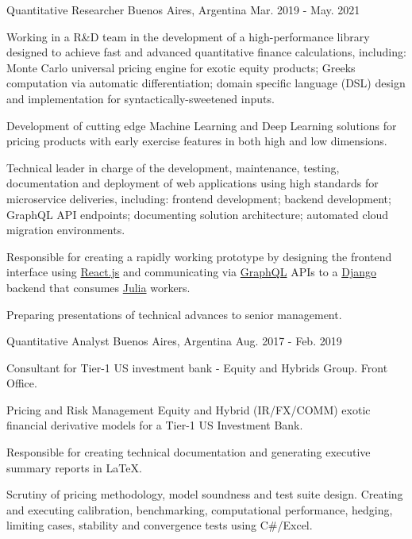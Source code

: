 \begin{cventries}
  \cventry
    {Quantitative Researcher} %
    {} %
    {Buenos Aires, Argentina} %
    {Mar. 2019 - May. 2021} %
    {
      \begin{cvitems} %
          \item{Working in a R\&D team in the development of a high-performance library designed to achieve fast and advanced quantitative finance calculations, including: Monte Carlo universal pricing engine for exotic equity products; Greeks computation via automatic differentiation; domain specific language (DSL) design and implementation for syntactically-sweetened inputs.}
          \item{Development of cutting edge Machine Learning and Deep Learning solutions for pricing products with early exercise features in both high and low dimensions.}
          \item {Technical leader in charge of the development, maintenance, testing, documentation and deployment of web applications using high standards for microservice deliveries, including: frontend development; backend development; GraphQL API endpoints; documenting solution architecture; automated cloud migration environments.}
          \item{Responsible for creating a rapidly working prototype by designing the frontend interface using \href{https://reactjs.org/}{React.js} and communicating via \href{https://graphql.org/}{GraphQL} APIs to a \href{https://www.djangoproject.com/}{Django} backend that consumes \href{https://julialang.org/}{Julia} workers.}
          \item{Preparing presentations of technical advances to senior management.}
      \end{cvitems}
    }

  \cventry
    {Quantitative Analyst} %
    {} %
    {Buenos Aires, Argentina} %
    {Aug. 2017 - Feb. 2019} %
    {
      \begin{cvitems} %
        \item{Consultant for Tier-1 US investment bank - Equity and Hybrids Group. Front Office.}
        \item {Pricing and Risk Management Equity and Hybrid (IR/FX/COMM) exotic financial derivative models for a Tier-1 US Investment Bank.}
        \item {Responsible for creating technical documentation and generating executive summary reports in \LaTeX.}
        \item{Scrutiny of pricing methodology, model soundness and test suite design. Creating and executing calibration, benchmarking, computational performance, hedging, limiting cases, stability and convergence tests using C\#/Excel.}
      \end{cvitems}
    }


\end{cventries}
